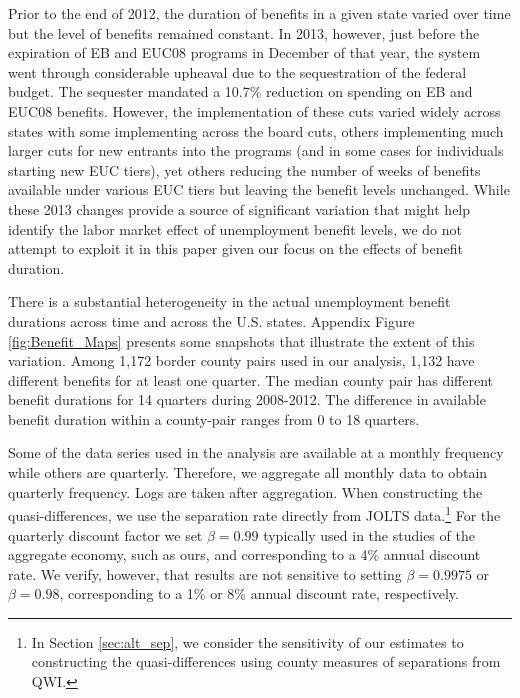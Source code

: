 \documentclass[12pt]{article}
\newcommand{\1}{\mathbf{1}}
\begin{document}
Prior to the end of 2012, the duration of benefits in a given state varied over time but the level of benefits remained constant. In 2013, however, just before the  expiration of EB and EUC08 programs in December of that year, the system went through considerable upheaval due to the sequestration of the federal budget. The sequester mandated a 10.7\% reduction on spending on EB and EUC08 benefits. However, the implementation of these cuts varied widely across states with some implementing across the board cuts, others implementing much larger cuts for new entrants into the programs (and in some cases for individuals starting new EUC tiers), yet others reducing the number of weeks of benefits available under various EUC tiers but leaving the benefit levels unchanged. While these 2013 changes provide a source of significant variation that might help identify the labor market effect of unemployment benefit levels, we do not attempt to exploit it in this paper given our focus on the effects of benefit duration.

There is a substantial heterogeneity in the actual unemployment benefit durations across time and across the U.S. states. Appendix Figure \ref{fig:Benefit_Maps} presents some snapshots that illustrate the extent of this variation. Among 1,172 border county pairs used in our analysis,  1,132 have different benefits for at least one quarter. The median county pair has different benefit durations for 14 quarters during 2008-2012. The difference in available benefit duration within a county-pair ranges from 0 to 18 quarters.

Some of the data series used in the analysis are available at a monthly frequency while others are quarterly. Therefore, we aggregate all monthly data to obtain quarterly frequency.  Logs are taken after aggregation. When constructing the quasi-differences, we use the separation rate directly from JOLTS data.\footnote{In Section \ref{sec:alt_sep}, we consider the sensitivity of our estimates to constructing the quasi-differences using county measures of separations from QWI.}  For the quarterly discount factor we set $\beta = 0.99$ typically used in the studies of the aggregate economy, such as ours, and corresponding to a $4\%$ annual discount rate. We verify, however, that results are not sensitive to setting $\beta = 0.9975$ or $\beta = 0.98$, corresponding to a 1\% or 8\% annual discount rate, respectively.

\end{document}
